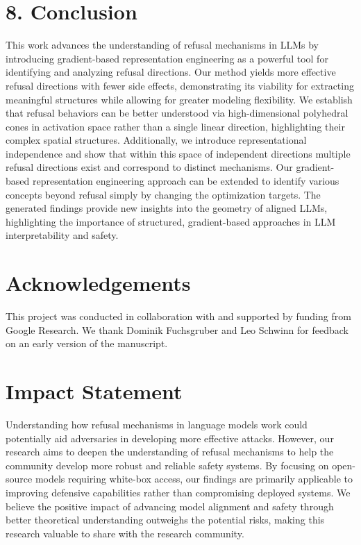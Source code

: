 \documentclass[10pt]{article}
\begin{document}
\section*{8. Conclusion}
This work advances the understanding of refusal mechanisms in LLMs by introducing gradient-based representation engineering as a powerful tool for identifying and analyzing refusal directions. Our method yields more effective refusal directions with fewer side effects, demonstrating its viability for extracting meaningful structures while allowing for greater modeling flexibility. We establish that refusal behaviors can be better understood via high-dimensional polyhedral cones in activation space rather than a single linear direction, highlighting their complex spatial structures. Additionally, we introduce representational independence and show that within this space of independent directions multiple refusal directions exist and correspond to distinct mechanisms. Our gradient-based representation engineering approach can be extended to identify various concepts beyond refusal simply by changing the optimization targets. The generated findings provide new insights into the geometry of aligned LLMs, highlighting the importance of structured, gradient-based approaches in LLM interpretability and safety.

\section*{Acknowledgements}
This project was conducted in collaboration with and supported by funding from Google Research. We thank Dominik Fuchsgruber and Leo Schwinn for feedback on an early version of the manuscript.

\section*{Impact Statement}
Understanding how refusal mechanisms in language models work could potentially aid adversaries in developing more effective attacks. However, our research aims to deepen the understanding of refusal mechanisms to help the community develop more robust and reliable safety systems. By focusing on open-source models requiring white-box access, our findings are primarily applicable to improving defensive capabilities rather than compromising deployed systems. We believe the positive impact of advancing model alignment and safety through better theoretical understanding outweighs the potential risks, making this research valuable to share with the research community.
\end{document}
